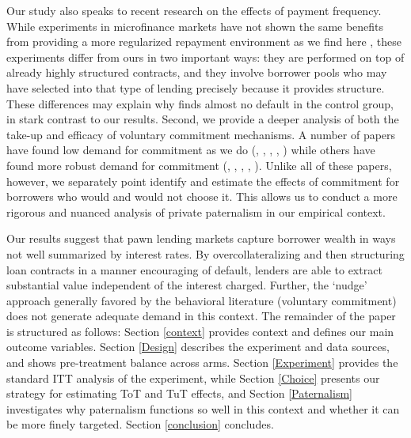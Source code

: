 \documentclass[oneside,11pt]{article}
\begin{document}
Our study also speaks to recent research on the effects of payment frequency. While experiments in microfinance markets have not shown the same benefits from providing a more regularized repayment environment as we find here \citep{Pande, barboni2023flexible}, these experiments differ from ours in two important ways: they are performed on top of already highly structured contracts, and they involve borrower pools who may have selected into that type of lending precisely because it provides structure. These differences may explain why \citep{Pande} finds almost no default in the control group, in stark contrast to our results. Second, we provide a deeper analysis of both the take-up and efficacy of voluntary commitment mechanisms. A number of papers have found low demand for commitment as we do (\cite{Ashraf}, \cite{Gine}, \cite{Ted}, \cite{Royer}, \cite{Sprenger}) while others have found more robust demand for commitment (\cite{Kremer},  \cite{Casaburi}, \cite{Alcohol}, \cite{AprajitP&P}, \cite{Pascaline}). Unlike all of these papers, however, we separately point identify and estimate the effects of commitment for borrowers who would and would not choose it. This allows us to conduct a more rigorous and nuanced analysis of private paternalism in our empirical context.

Our results suggest that pawn lending markets capture borrower wealth in ways not well summarized by interest rates. By overcollateralizing and then structuring loan contracts in a manner encouraging of default, lenders are able to extract substantial value independent of the interest charged.  Further, the `nudge’ approach generally favored by the behavioral literature (voluntary commitment) does not generate adequate demand in this context. 
The remainder of the paper is structured as follows:  Section \ref{context} provides context and defines our main outcome variables. Section \ref{Design} describes the experiment and data sources, and shows pre-treatment balance across arms. Section \ref{Experiment} provides the standard ITT analysis of the experiment, while Section \ref{Choice} presents our strategy for estimating ToT and TuT effects, and Section \ref{Paternalism} investigates why paternalism functions so well in this context and whether it can be more finely targeted.  Section \ref{conclusion} concludes.
\end{document}

